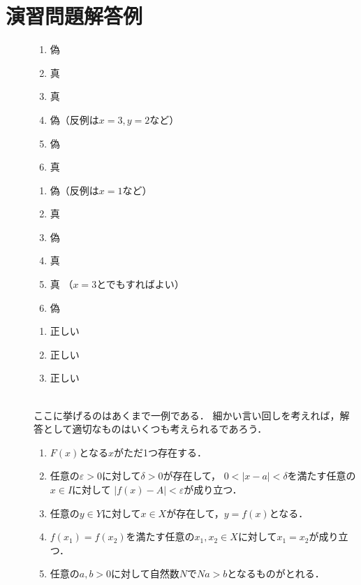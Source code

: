 \chapter{演習問題解答例} \label{answer}
\begin{description}
  \item[] \mbox{}
  \begin{enumerate}
   \item 偽
   \item 真
   \item 真
   \item 偽（反例は$x=3,  y=2$など）
   \item 偽
   \item 真
  \end{enumerate}
\item[] \mbox{} 
  \begin{enumerate}
   \item 偽（反例は$x=1$など）
   \item 真
   \item 偽
   \item 真
   \item 真 （$x=3$とでもすればよい）
   \item 偽
  \end{enumerate}
\item[] \mbox{} 
  \begin{enumerate}
   \item 正しい
   \item 正しい
   \item 正しい
  \end{enumerate}
\item[] \mbox{} \\
  ここに挙げるのはあくまで一例である．
  細かい言い回しを考えれば，解答として適切なものはいくつも考えられるであろう．
  \begin{enumerate}
    \item  $F(x)$となる$x$がただ1つ存在する．
    \item 任意の$\varepsilon >0$に対して$\delta >0$が存在して，
      $0< \lvert x- a \rvert < \delta$を満たす任意の$x \in I$に対して
      $\lvert f(x) -A \rvert < \varepsilon$が成り立つ．
    \item 任意の$y \in Y$に対して$x \in X$が存在して，$y=f(x)$となる．
    \item $f(x_1 )=f(x_2) $を満たす任意の$x_1, x_2 \in X$に対して$x_1 = x_2$が成り立つ．
    \item 任意の$a,b >0$に対して自然数$N$で$Na >b$となるものがとれる．
  \end{enumerate}


\end{description}
